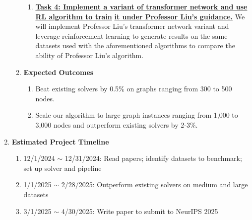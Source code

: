 \documentclass{article}
\begin{document}
\begin{enumerate}
\begin{enumerate}
\begin{enumerate}
		\item \textbf{\underline{Task 4: Implement a variant of transformer network and use RL algorithm to train}}
		\newline
		\textbf{\underline{it under Professor Liu's guidance.}} We will implement Professor Liu's transformer network variant and leverage reinforcement learning to generate results on the same datasets used with the aforementioned algorithms to compare the ability of Professor Liu's algorithm.

	\end{enumerate}

	\item \textbf{Expected Outcomes}
	
	\begin{enumerate}
		\item Beat existing solvers by 0.5\% on graphs ranging from 300 to 500 nodes.
		\item Scale our algorithm to large graph instances ranging from 1,000 to 3,000 nodes and outperform existing solvers by 2-3\%.
	\end{enumerate}

\end{enumerate}

\item \textbf{Estimated Project Timeline}
\begin{enumerate}
	\item 12/1/2024 $\sim$ 12/31/2024: Read papers; identify datasets to benchmark; set up solver and pipeline
	\item 1/1/2025 $\sim$ 2/28/2025: Outperform existing solvers on medium and large datasets
	\item 3/1/2025 $\sim$ 4/30/2025: Write paper to submit to NeurIPS 2025
\end{enumerate}

\end{enumerate}
\end{document}
